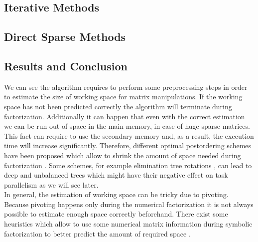 
\label{subseq:overview-of-linear-solver-types}

\subsection{Iterative Methods}


\subsection{Direct Sparse Methods}


\subsection{Results and Conclusion}


We can see the algorithm requires to perform some preprocessing steps in order to estimate the size of working space for matrix manipulations. If the working space has not been predicted correctly the algorithm will terminate during factorization. Additionally it can happen that even with the correct estimation we can be run out of space in the main memory, in case of huge sparse matrices. This fact can require to use the secondary memory and, as a result, the execution time will increase significantly. Therefore, different optimal postordering schemes have been proposed which allow to shrink the amount of space needed during factorization \cite{mm:optimal-tree-postordering} \cite{mm:elimination-tree-rotations}. Some schemes, for example elimination tree rotations \cite{mm:elimination-tree-rotations}, can lead to deep and unbalanced trees which might have their negative effect on task parallelism as we will see later.\\


In general, the estimation of working space can be tricky due to pivoting. Because pivoting happens only during the numerical factorization it is not always possible to estimate enough space correctly beforehand. There exist some heuristics which allow to use some numerical matrix information during symbolic factorization to better predict the amount of required space \cite{wsmp:direct-solution-of-general-system}.\\
